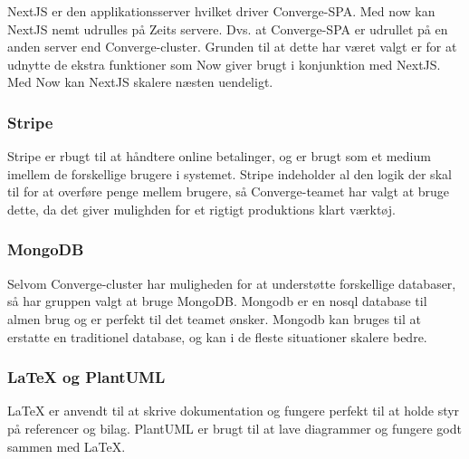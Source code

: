 NextJS er den applikationsserver hvilket driver Converge-SPA. Med now kan NextJS nemt udrulles på Zeits servere. Dvs. at Converge-SPA er udrullet på en anden server end Converge-cluster. Grunden til at dette har været valgt er for at udnytte de ekstra funktioner som Now giver brugt i konjunktion med NextJS. Med Now kan NextJS skalere næsten uendeligt.

\subsubsection{Stripe}

Stripe er rbugt til at håndtere online betalinger, og er brugt som et medium imellem de forskellige brugere i systemet. Stripe indeholder al den logik der skal til for at overføre penge mellem brugere, så Converge-teamet har valgt at bruge dette, da det giver mulighden for et rigtigt produktions klart værktøj.

\subsubsection{MongoDB}

Selvom Converge-cluster har muligheden for at understøtte forskellige databaser, så har gruppen valgt at bruge MongoDB. Mongodb er en nosql database til almen brug og er perfekt til det teamet ønsker. Mongodb kan bruges til at erstatte en traditionel database, og kan i de fleste situationer skalere bedre.

\subsubsection{LaTeX og PlantUML}

LaTeX er anvendt til at skrive dokumentation og fungere perfekt til at holde styr på referencer og bilag. PlantUML er brugt til at lave diagrammer og fungere godt sammen med LaTeX.
